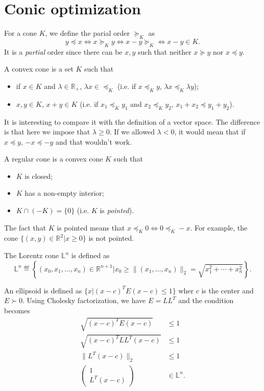 \section{Conic optimization}
For a cone $K$,
we define the parial order $\succeq_K$ as
\[ y \preceq x \iff x \succeq_K y \iff x - y \succeq_K \iff x - y \in K. \]
It is a \emph{partial} order since there can be $x,y$ such that
neither $x \succeq y$ nor $x \preceq y$.

\begin{mydef}
  A convex cone is a set $K$ such that
  \begin{itemize}
    \item if $x \in K$ and $\lambda \in \mathbb{R}_+$, $\lambda x \in \preceq_K$
      (i.e. if $x \preceq_K y$, $\lambda x \preceq_K \lambda y$);
    \item $x, y \in K$, $x + y \in K$
      (i.e. if $x_1 \preceq_K y_1$ and $x_2 \preceq_K y_2$, $x_1 + x_2 \preceq y_1 + y_2$).
  \end{itemize}
\end{mydef}
It is interesting to compare it with the definition of a vector space.
The difference is that here we impose that $\lambda \geq 0$.
If we allowed $\lambda < 0$, it would mean that if $x \preceq y$, $-x \preceq -y$ and that wouldn't work.

\begin{mydef}
  A regular cone is a convex cone $K$ such that
  \begin{itemize}
    \item $K$ is closed;
    \item $K$ has a non-empty interior;
    \item $K \cap (-K) = \{0\}$ (i.e. $K$ is \emph{pointed}).
  \end{itemize}
\end{mydef}
The fact that $K$ is pointed means that $x \preceq_K 0 \iff 0 \preceq_K -x$.
For example, the cone $\{(x,y) \in \mathbb{R}^2 | x \geq 0\}$ is not pointed.

\begin{mydef}
  The Lorentz cone $\mathbb{L}^n$ is defined as
  \[ \mathbb{L}^n \eqdef \left\{(x_0, x_1, \ldots, x_n) \in \mathbb{R}^{n+1} | x_0 \geq \|(x_1, \ldots, x_n)\|_2 = \sqrt{x_1^2 + \cdots + x_n^2}\right\}. \]
\end{mydef}

\begin{myexem}[Ellipsoid]
  An ellipsoid is defined as $\{x|(x-c)^TE(x-c) \leq 1\}$ wher $c$ is the center
  and $E \succ 0$.
  Using Cholesky factorization, we have $E = LL^T$ and the condition becomes
  \begin{align*}
    \sqrt{(x-c)^TE(x-c)} & \leq 1\\
    \sqrt{(x-c)^TLL^T(x-c)} & \leq 1\\
    \|L^T(x-c)\|_2 & \leq 1\\
    \begin{pmatrix}
      1\\
      L^T(x-c)
    \end{pmatrix}
    & \in \mathbb{L}^n.
  \end{align*}
\end{myexem}

\biblio



